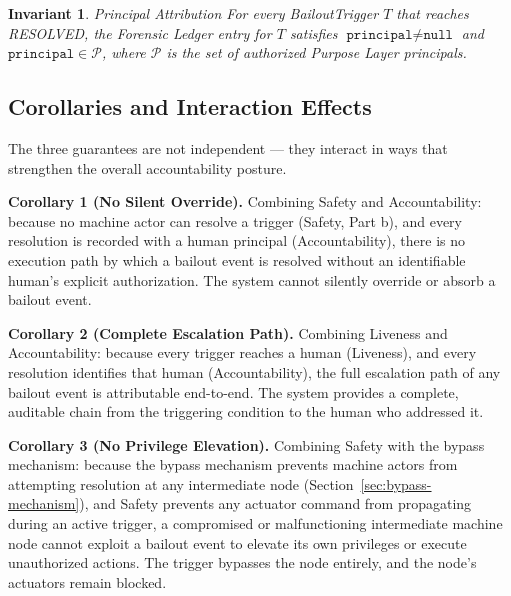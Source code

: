 \documentclass[12pt]{article}
\newtheorem{invariant}{Invariant}
\begin{document}
\begin{invariant}{Principal Attribution}
\label{inv:principal-attribution}
For every BailoutTrigger $T$ that reaches RESOLVED, the Forensic Ledger entry for $T$ satisfies $\texttt{principal} \neq \texttt{null}$ and $\texttt{principal} \in \mathcal{P}$, where $\mathcal{P}$ is the set of authorized Purpose Layer principals.
\end{invariant}

\subsection{Corollaries and Interaction Effects}
\label{sec:guarantee-corollaries}

The three guarantees are not independent — they interact in ways that strengthen the overall accountability posture.

\bigskip

\noindent\textbf{Corollary 1 (No Silent Override).} Combining Safety and Accountability: because no machine actor can resolve a trigger (Safety, Part b), and every resolution is recorded with a human principal (Accountability), there is no execution path by which a bailout event is resolved without an identifiable human's explicit authorization. The system cannot silently override or absorb a bailout event.

\medskip

\noindent\textbf{Corollary 2 (Complete Escalation Path).} Combining Liveness and Accountability: because every trigger reaches a human (Liveness), and every resolution identifies that human (Accountability), the full escalation path of any bailout event is attributable end-to-end. The system provides a complete, auditable chain from the triggering condition to the human who addressed it.

\medskip

\noindent\textbf{Corollary 3 (No Privilege Elevation).} Combining Safety with the bypass mechanism: because the bypass mechanism prevents machine actors from attempting resolution at any intermediate node (Section~\ref{sec:bypass-mechanism}), and Safety prevents any actuator command from propagating during an active trigger, a compromised or malfunctioning intermediate machine node cannot exploit a bailout event to elevate its own privileges or execute unauthorized actions. The trigger bypasses the node entirely, and the node's actuators remain blocked.
\end{document}
